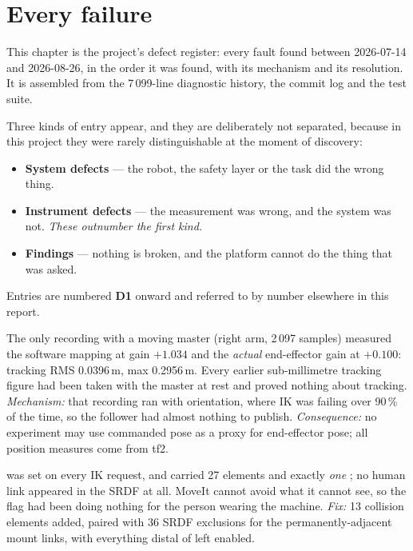 \chapter{Every failure}\label{ch:failures}

This chapter is the project's defect register: every fault found between
2026-07-14 and 2026-08-26, in the order it was found, with its mechanism and
its resolution. It is assembled from the 7\,099-line diagnostic history, the
commit log and the test suite.

Three kinds of entry appear, and they are deliberately not separated, because
in this project they were rarely distinguishable at the moment of discovery:

\begin{itemize}
\item \textbf{System defects} --- the robot, the safety layer or the task did
      the wrong thing.
\item \textbf{Instrument defects} --- the measurement was wrong, and the
      system was not. \emph{These outnumber the first kind.}
\item \textbf{Findings} --- nothing is broken, and the platform cannot do the
      thing that was asked.
\end{itemize}

Entries are numbered \textbf{D1} onward and referred to by number elsewhere in
this report.


{The only recording with a moving master (right arm, 2\,097 samples) measured
the software mapping at gain $+1.034$ and the \emph{actual} end-effector gain
at $+0.100$: tracking RMS 0.0396\,m, max 0.2956\,m. Every earlier
sub-millimetre tracking figure had been taken with the master at rest and
proved nothing about tracking. \textit{Mechanism:} that recording ran with
 orientation, where IK was failing over 90\,\% of the time, so
the follower had almost nothing to publish. \textit{Consequence:} no
experiment may use commanded pose as a proxy for end-effector pose; all
position measures come from tf2.}

{ was set on every IK request, and
 carried 27  elements and exactly
\emph{one} ; no human link appeared in the SRDF at all.
MoveIt cannot avoid what it cannot see, so the flag had been doing nothing for
the person wearing the machine. \textit{Fix:} 13 collision elements added,
paired with 36 SRDF exclusions for the permanently-adjacent mount links, with
everything distal of  left enabled.}

